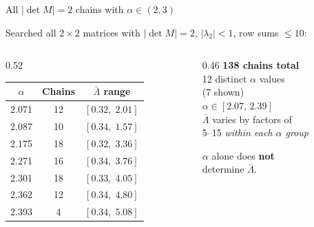 \documentclass[aspectratio=169, 11pt]{beamer}
\begin{document}
\begin{frame}[shrink=3]{All $|\det M|{=}2$ chains with $\alpha \in (2,3)$}

Searched all $2\times2$ matrices with $|\det M| = 2$,\;
$|\lambda_2| < 1$,\; row sums $\leq 10$:

\medskip
\begin{columns}[c]
\begin{column}{0.52\textwidth}
\centering
\small
\begin{tabular}{ccc}
\toprule
$\alpha$ & Chains & $\bar\Lambda$ range \\
\midrule
2.071 & 12 & $[0.32,\; 2.01]$ \\
2.087 & 10 & $[0.34,\; 1.57]$ \\
2.175 & 18 & $[0.32,\; 3.36]$ \\
2.271 & 16 & $[0.34,\; 3.76]$ \\
2.301 & 18 & $[0.33,\; 4.05]$ \\
2.362 & 12 & $[0.34,\; 4.80]$ \\
2.393 &  4 & $[0.34,\; 5.08]$ \\
\bottomrule
\end{tabular}
\end{column}
\begin{column}{0.46\textwidth}
\textbf{138 chains total}\\
12 distinct $\alpha$ values\\
(7 shown)\\[0.3em]
$\alpha \in [2.07,\, 2.39]$\\[0.5em]
$\bar\Lambda$ varies by factors of\\
5--15 \emph{within each $\alpha$ group}\\[0.5em]
\colorbox{newbg}{\parbox{0.9\linewidth}{\small
  $\alpha$ alone does \textbf{not}\\
  determine $\bar\Lambda$.
}}
\end{column}
\end{columns}

\end{frame}
\end{document}
